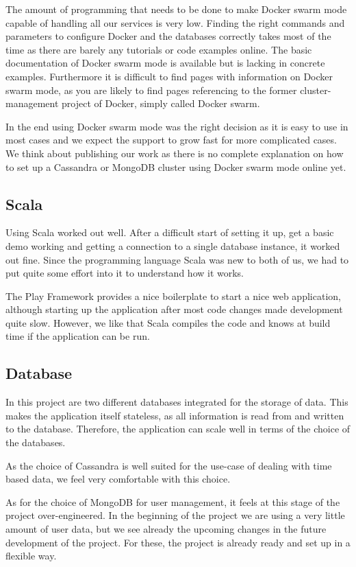 \documentclass[a4paper]{article}
\begin{document}
The amount of programming that needs to be done to make Docker swarm mode capable of handling all our services is very low. Finding the right commands and parameters to configure Docker and the databases correctly takes most of the time as there are barely any tutorials or code examples online. The basic documentation of Docker swarm mode is available but is lacking in concrete examples. Furthermore it is difficult to find pages with information on Docker swarm mode, as you are likely to find pages referencing to the former cluster-management project of Docker, simply called Docker swarm.

In the end using Docker swarm mode was the right decision as it is easy to use in most cases and we expect the support to grow fast for more complicated cases. We think about publishing our work as there is no complete explanation on how to set up a Cassandra or MongoDB cluster using Docker swarm mode online yet.

\subsection{Scala}
Using Scala worked out well. After a difficult start of setting it up, get a basic demo working and getting a connection to a single database instance, it worked out fine. Since the programming language Scala was new to both of us, we had to put quite some effort into it to understand how it works.

The Play Framework provides a nice boilerplate to start a nice web application, although starting up the application after most code changes made development quite slow. However, we like that Scala compiles the code and knows at build time if the application can be run.

\subsection{Database}
In this project are two different databases integrated for the storage of data. This makes the application itself stateless, as all information is read from and written to the database. Therefore, the application can scale well in terms of the choice of the databases.

As the choice of Cassandra is well suited for the use-case of dealing with time based data, we feel very comfortable with this choice.

As for the choice of MongoDB for user management, it feels at this stage of the project over-engineered. In the beginning of the project we are using a very little amount of user data, but we see already the upcoming changes in the future development of the project. For these, the project is already ready and set up in a flexible way.
\end{document}
